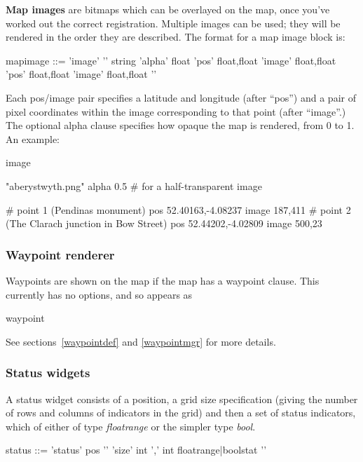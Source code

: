 \textbf{Map images} are bitmaps which can be overlayed on the map,
once you've worked out the correct registration. Multiple images can
be used; they will be rendered in the order they are described.
The format for a map image block is:
\begin{v}
mapimage    ::= 'image' '{'
                    string
                    { 'alpha' float }
                    'pos' float,float
                    'image' float,float
                    'pos' float,float
                    'image' float,float
                    '}'
\end{v}
Each pos/image pair specifies a latitude and longitude (after ``pos'') and a
pair of pixel coordinates within the image corresponding to that point (after ``image''.)
The optional alpha clause specifies how opaque the map is rendered, from 0 to 1.
An example:
\begin{v}
image {
    "aberystwyth.png"
    alpha 0.5  # for a half-transparent image
                
    # point 1 (Pendinas monument)
    pos 52.40163,-4.08237   image 187,411
    # point 2 (The Clarach junction in Bow Street)
    pos 52.44202,-4.02809   image 500,23
}   

\end{v}

\subsubsection{Waypoint renderer}
\label{waypointrdr}
Waypoints are shown on the map if the map has a waypoint clause.
This currently has no options, and so appears as
\begin{v}
waypoint {}
\end{v}
See sections~\ref{waypointdef} and \ref{waypointmgr} for more
details.


\subsubsection{Status widgets}
A status widget consists of a position, a grid size specification
(giving the number of rows and columns of indicators in the grid)
and then a set of status indicators, which of either 
of type \emph{floatrange} or the simpler type \emph{bool}.

\begin{v}
status      ::= 'status' pos '{' 
                'size' int ',' int
                { floatrange|boolstat }
               '}'
\end{v}

